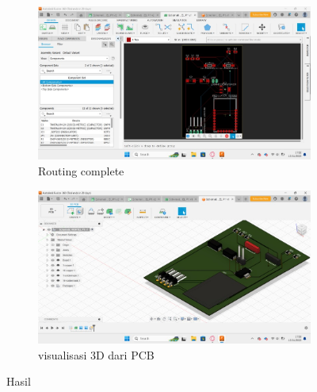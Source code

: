 \begin{figure}[H]
  \centering
  \begin{subfigure}[c]{0.4\linewidth}
    \centering
    \includegraphics[width=\linewidth]{img/modul_1/PCB DONE.jpeg}
    \caption{Routing complete\label{fig:inisub1}}
  \end{subfigure}
  \hspace{1cm}
  \begin{subfigure}[c]{0.4\linewidth}
    \centering
    \includegraphics[width=\linewidth]{img/modul_1/3D Model.jpeg}
    \caption{visualisasi 3D dari PCB\label{fig:inisub2}}
  \end{subfigure}
  \caption{Hasil\label{fig:keduagambar}}
\end{figure}